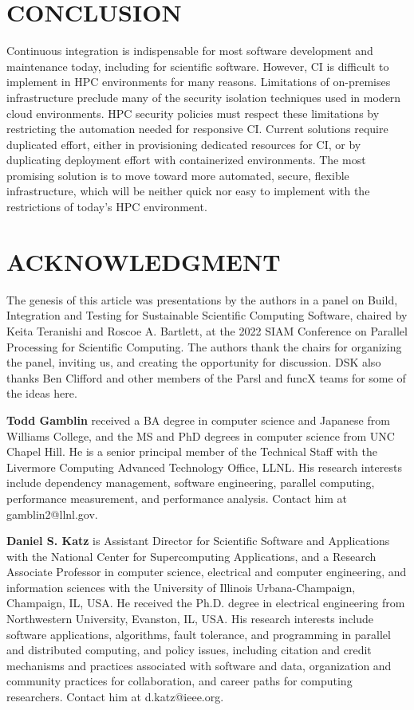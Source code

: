 \documentclass{IEEEcsmag}
\begin{document}
\section{CONCLUSION}

Continuous integration is indispensable for most software development and
maintenance today, including for scientific software.
However, CI is difficult to implement in HPC environments for many reasons.
Limitations of on-premises infrastructure preclude many of the security isolation
techniques used in modern cloud environments. HPC security policies must respect these
limitations by restricting the automation needed for responsive CI. Current solutions
require duplicated effort, either in provisioning dedicated resources for CI, or by
duplicating deployment effort with containerized environments. The most promising
solution is to move toward more automated, secure, flexible infrastructure,
which will be
neither quick nor easy to implement with the restrictions of today's HPC environment.

\section{ACKNOWLEDGMENT}

The genesis of this article was presentations by the authors in a panel on Build, Integration and Testing for
Sustainable Scientific Computing Software, chaired by Keita Teranishi and Roscoe A. Bartlett, at the 2022
SIAM Conference on Parallel Processing for Scientific Computing. The authors thank the chairs for organizing
the panel, inviting us, and creating the opportunity for discussion. DSK also thanks Ben Clifford and other
members of the Parsl and funcX teams for some of the ideas here.




\bigskip

\textbf{Todd Gamblin} received a BA degree in computer science and Japanese from Williams College, and the MS and PhD degrees in computer science from UNC Chapel Hill. He is a senior principal member of the Technical Staff with the Livermore Computing Advanced Technology Office, LLNL. His research interests include dependency management, software engineering, parallel computing, performance measurement, and performance analysis. 
Contact him at gamblin2@llnl.gov.

\textbf{Daniel S. Katz} is Assistant Director for Scientific Software and Applications with the National Center for Supercomputing Applications, and a Research Associate Professor in computer science, electrical and computer engineering, and information sciences with the University of Illinois Urbana-Champaign, Champaign, IL, USA. He received the Ph.D. degree in electrical engineering from Northwestern University, Evanston, IL, USA. His research interests include software applications, algorithms, fault tolerance, and programming in parallel and distributed computing, and policy issues, including citation and credit mechanisms and practices associated with software and data, organization and community practices for collaboration, and career paths for computing researchers. 
Contact him at d.katz@ieee.org.
\end{document}
